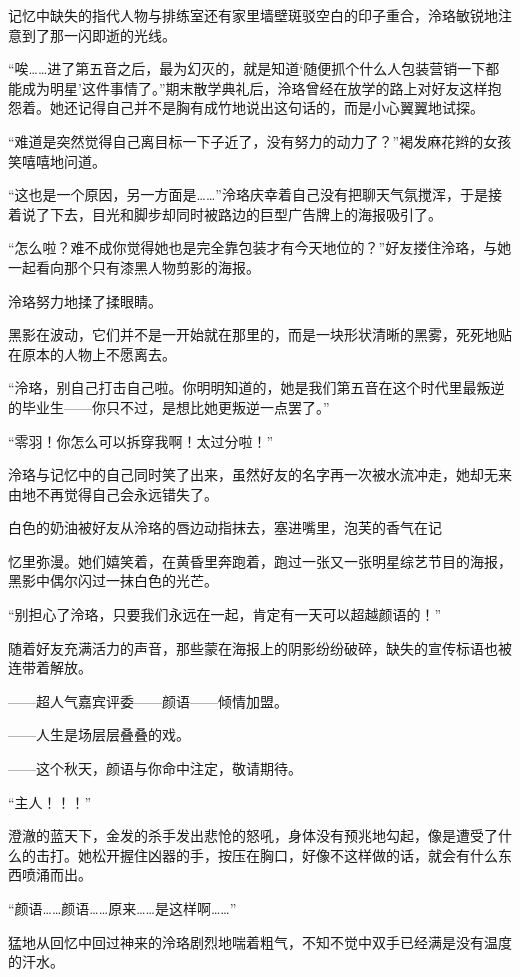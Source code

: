 \documentclass[UTF8, scheme = chinese, openany]{ctexbook}
\begin{document}
记忆中缺失的指代人物与排练室还有家里墙壁斑驳空白的印子重合，泠珞敏锐地注意到了那一闪即逝的光线。

“唉……进了第五音之后，最为幻灭的，就是知道‘随便抓个什么人包装营销一下都能成为明星’这件事情了。”期末散学典礼后，泠珞曾经在放学的路上对好友这样抱怨着。她还记得自己并不是胸有成竹地说出这句话的，而是小心翼翼地试探。

“难道是突然觉得自己离目标一下子近了，没有努力的动力了？”褐发麻花辫的女孩笑嘻嘻地问道。

“这也是一个原因，另一方面是……”泠珞庆幸着自己没有把聊天气氛搅浑，于是接着说了下去，目光和脚步却同时被路边的巨型广告牌上的海报吸引了。

“怎么啦？难不成你觉得她也是完全靠包装才有今天地位的？”好友搂住泠珞，与她一起看向那个只有漆黑人物剪影的海报。

泠珞努力地揉了揉眼睛。

黑影在波动，它们并不是一开始就在那里的，而是一块形状清晰的黑雾，死死地贴在原本的人物上不愿离去。

“泠珞，别自己打击自己啦。你明明知道的，她是我们第五音在这个时代里最叛逆的毕业生——你只不过，是想比她更叛逆一点罢了。”

“零羽！你怎么可以拆穿我啊！太过分啦！”

泠珞与记忆中的自己同时笑了出来，虽然好友的名字再一次被水流冲走，她却无来由地不再觉得自己会永远错失了。

白色的奶油被好友从泠珞的唇边动指抹去，塞进嘴里，泡芙的香气在记

忆里弥漫。她们嬉笑着，在黄昏里奔跑着，跑过一张又一张明星综艺节目的海报，黑影中偶尔闪过一抹白色的光芒。

“别担心了泠珞，只要我们永远在一起，肯定有一天可以超越颜语的！”

随着好友充满活力的声音，那些蒙在海报上的阴影纷纷破碎，缺失的宣传标语也被连带着解放。

——超人气嘉宾评委——颜语——倾情加盟。

——人生是场层层叠叠的戏。

——这个秋天，颜语与你命中注定，敬请期待。

\vspace{1.5em}

“主人！！！”

澄澈的蓝天下，金发的杀手发出悲怆的怒吼，身体没有预兆地勾起，像是遭受了什么的击打。她松开握住凶器的手，按压在胸口，好像不这样做的话，就会有什么东西喷涌而出。

“颜语……颜语……原来……是这样啊……”

猛地从回忆中回过神来的泠珞剧烈地喘着粗气，不知不觉中双手已经满是没有温度的汗水。
\end{document}
